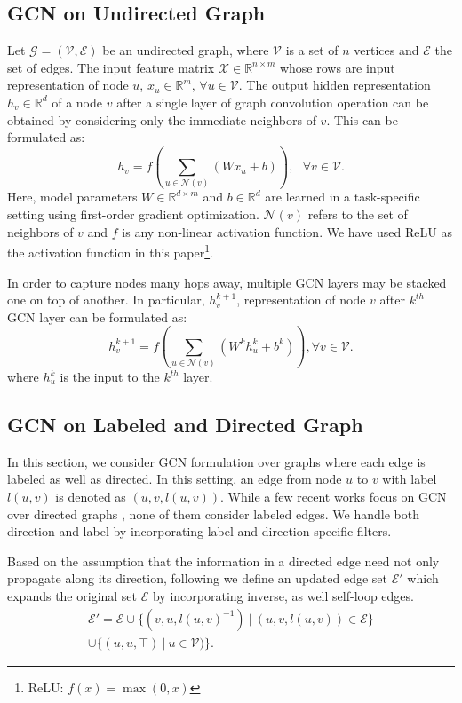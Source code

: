 \documentclass[11pt,a4paper]{article}
\newcommand{\m}[1]{\mathcal{#1}}
\begin{document}
\subsection{GCN on Undirected Graph}
\label{sec:undirected_gcn}

Let $\m{G} = (\m{V}, \m{E})$ be an undirected graph, where $\m{V}$ is a set of $n$ vertices and $\m{E}$ the set of edges. The input feature matrix  $\m{X} \in \mathbb{R}^{n \times m}$ whose rows are input representation of node $u$, $x_{u} \in \mathbb{R}^{m}\text{, }\forall u \in \m{V}$. The output hidden representation $h_v \in \mathbb{R}^{d}$ of a node $v$ after a single layer of graph convolution operation can be obtained by considering only the immediate neighbors of  $v$. This can be formulated as:
$$h_{v} = f\left(\sum_{u \in \m{N}(v)}\left(W x_{u} + b\right)\right),~~~\forall v \in \m{V} .$$
Here, model parameters $W \in \mathbb{R}^{d \times m}$ and $b \in \mathbb{R}^{d}$ are learned in a task-specific setting using first-order gradient optimization. $\m{N}(v)$ refers to the set of neighbors of $v$ and $f$ is any non-linear activation function. We have used ReLU as the activation function in this paper\footnote{ReLU: $f(x) = \max(0, x)$}.  

In order to capture nodes many hops away, multiple GCN layers may be stacked one on top of another. In particular, $h^{k+1}_{v}$, representation of node $v$  after $k^{th}$ GCN layer can be formulated as:
$$h^{k+1}_{v} = f\left(\sum_{u \in \m{N}(v)}\left(W^{k} h^{k}_{u} + b^{k}\right)\right), \forall v \in \m{V} . $$
where $h^{k}_{u}$ is the input to the $k^{th}$ layer.

\subsection{GCN on Labeled and Directed Graph}
\label{sec:directed_gcn}

In this section, we consider GCN formulation over graphs where each edge is labeled as well as directed. In this setting, an edge from node $u$ to $v$ with label $l(u, v)$ is denoted as $(u, v, l(u, v))$. While a few recent works focus on GCN over directed graphs \cite{gcn_summ,gcn_srl}, none of them consider labeled edges. We handle both direction and label by incorporating label and direction specific filters.

Based on the assumption that the information in a directed edge need not only propagate along its direction, following \cite{gcn_srl} we define an updated edge set $\m{E'}$ which expands the original set $\m{E}$ by incorporating inverse, as well self-loop edges.
\begin{multline}	
\m{E'} = \m{E} \cup \{(v,u,l(u,v)^{-1})~|~ (u,v,l(u,v)) \in \m{E}\}  \\
\cup \{(u, u, \top)~|~u \in \m{V})\} \label{eqn:updated_edges}.
\end{multline}
\end{document}
